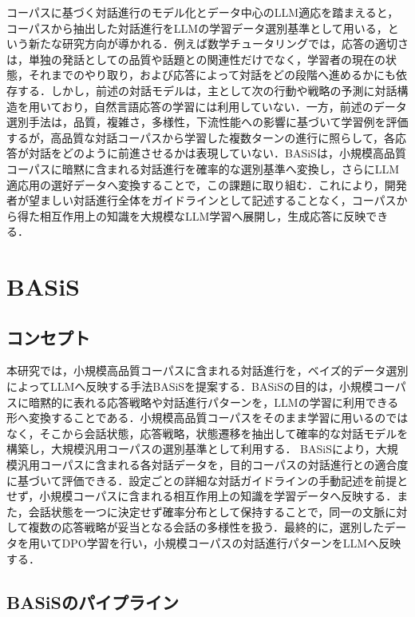 \documentclass[manuscript,review,anonymous]{acmart}
\begin{document}
コーパスに基づく対話進行のモデル化とデータ中心のLLM適応を踏まえると，コーパスから抽出した対話進行をLLMの学習データ選別基準として用いる，という新たな研究方向が導かれる．例えば数学チュータリングでは，応答の適切さは，単独の発話としての品質や話題との関連性だけでなく，学習者の現在の状態，それまでのやり取り，および応答によって対話をどの段階へ進めるかにも依存する．しかし，前述の対話モデルは，主として次の行動や戦略の予測に対話構造を用いており，自然言語応答の学習には利用していない．一方，前述のデータ選別手法は，品質，複雑さ，多様性，下流性能への影響に基づいて学習例を評価するが，高品質な対話コーパスから学習した複数ターンの進行に照らして，各応答が対話をどのように前進させるかは表現していない．BASiSは，小規模高品質コーパスに暗黙に含まれる対話進行を確率的な選別基準へ変換し，さらにLLM適応用の選好データへ変換することで，この課題に取り組む．これにより，開発者が望ましい対話進行全体をガイドラインとして記述することなく，コーパスから得た相互作用上の知識を大規模なLLM学習へ展開し，生成応答に反映できる．


\section{BASiS}
\label{sec:method}

\subsection{コンセプト}
\label{sec:method_concept}

本研究では，小規模高品質コーパスに含まれる対話進行を，ベイズ的データ選別によってLLMへ反映する手法BASiSを提案する．BASiSの目的は，小規模コーパスに暗黙的に表れる応答戦略や対話進行パターンを，LLMの学習に利用できる形へ変換することである．小規模高品質コーパスをそのまま学習に用いるのではなく，そこから会話状態，応答戦略，状態遷移を抽出して確率的な対話モデルを構築し，大規模汎用コーパスの選別基準として利用する．
BASiSにより，大規模汎用コーパスに含まれる各対話データを，目的コーパスの対話進行との適合度に基づいて評価できる．設定ごとの詳細な対話ガイドラインの手動記述を前提とせず，小規模コーパスに含まれる相互作用上の知識を学習データへ反映する．また，会話状態を一つに決定せず確率分布として保持することで，同一の文脈に対して複数の応答戦略が妥当となる会話の多様性を扱う．最終的に，選別したデータを用いてDPO学習を行い，小規模コーパスの対話進行パターンをLLMへ反映する．

\subsection{BASiSのパイプライン}
\label{sec:method_architecture}
\end{document}
